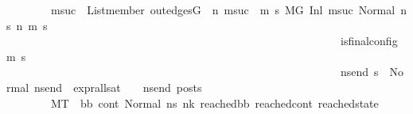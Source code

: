 \begin{isabellebody}
\ \ \ \ \ \ \ \ {\isasymforall}msuc{}{\isachardot}{\kern0pt}\ \ List{\isachardot}{\kern0pt}member\ {\isacharparenleft}{\kern0pt}out{\isacharunderscore}{\kern0pt}edges{\isacharparenleft}{\kern0pt}G{\isacharparenright}{\kern0pt}\ {\isacharbang}{\kern0pt}\ n{\isacharparenright}{\kern0pt}\ msuc{}\ {\isasymlongrightarrow}\ {\isacharparenleft}{\kern0pt}{\isasymforall}m{\isacharprime}{\kern0pt}\ s{\isacharprime}{\kern0pt}{\isachardot}{\kern0pt}\ {\isacharparenleft}{\kern0pt}{\isacharparenleft}{\kern0pt}M{\isacharcomma}{\kern0pt}{\isasymLambda}{\isacharcomma}{\kern0pt}{\isasymGamma}{\isacharcomma}{\kern0pt}{\isasymOmega}{\isacharcomma}{\kern0pt}G\ {\isasymturnstile}{\isacharparenleft}{\kern0pt}Inl\ {\isacharparenleft}{\kern0pt}msuc{}{\isacharparenright}{\kern0pt}{\isacharcomma}{\kern0pt}\ Normal\ ns{}{\isacharprime}{\kern0pt}{\isacharprime}{\kern0pt}{\isacharparenright}{\kern0pt}\ {\isacharminus}{\kern0pt}n{\isasymrightarrow}{\isacharasterisk}{\kern0pt}\ {\isacharparenleft}{\kern0pt}m{\isacharprime}{\kern0pt}{\isacharcomma}{\kern0pt}\ s{\isacharprime}{\kern0pt}{\isacharparenright}{\kern0pt}{\isacharparenright}{\kern0pt}\ {\isasymlongrightarrow}\isanewline
\ \ \ \ \ \ \ \ \ \ \ \ \ \ \ \ \ \ \ \ \ \ \ \ \ \ \ \ \ \ \ \ \ \ \ \ \ \ \ \ \ \ \ \ \ \ \ \ \ \ \ \ \ \ \ \ \ \ \ \ is{\isacharunderscore}{\kern0pt}final{\isacharunderscore}{\kern0pt}config\ {\isacharparenleft}{\kern0pt}m{\isacharprime}{\kern0pt}{\isacharcomma}{\kern0pt}\ s{\isacharprime}{\kern0pt}{\isacharparenright}{\kern0pt}\ {\isasymlongrightarrow}\ \isanewline
\ \ \ \ \ \ \ \ \ \ \ \ \ \ \ \ \ \ \ \ \ \ \ \ \ \ \ \ \ \ \ \ \ \ \ \ \ \ \ \ \ \ \ \ \ \ \ \ \ \ \ \ \ \ \ \ \ \ \ \ {\isacharparenleft}{\kern0pt}{\isasymforall}ns{\isacharunderscore}{\kern0pt}end{\isachardot}{\kern0pt}\ s{\isacharprime}{\kern0pt}\ {\isacharequal}{\kern0pt}\ Normal\ ns{\isacharunderscore}{\kern0pt}end\ {\isasymlongrightarrow}\ expr{\isacharunderscore}{\kern0pt}all{\isacharunderscore}{\kern0pt}sat\ {\isasymLambda}\ {\isasymGamma}\ {\isasymOmega}\ ns{\isacharunderscore}{\kern0pt}end\ posts{\isacharparenright}{\kern0pt}{\isacharparenright}{\kern0pt}{\isacharparenright}{\kern0pt}\ {\isasymLongrightarrow}\isanewline
\ \ \ \ \ \ \ \ M{\isacharcomma}{\kern0pt}{\isasymLambda}{\isacharcomma}{\kern0pt}{\isasymGamma}{\isacharcomma}{\kern0pt}{\isasymOmega}{\isacharcomma}{\kern0pt}T\ {\isasymturnstile}\ {\isacharparenleft}{\kern0pt}bb{}{\isacharcomma}{\kern0pt}\ cont{}{\isacharcomma}{\kern0pt}\ {\isacharparenleft}{\kern0pt}Normal\ ns{}{\isacharprime}{\kern0pt}{\isacharprime}{\kern0pt}{\isacharparenright}{\kern0pt}{\isacharparenright}{\kern0pt}\ {\isacharminus}{\kern0pt}n{\isasymlongrightarrow}{\isacharcircum}{\kern0pt}k\ {\isacharparenleft}{\kern0pt}reached{\isacharunderscore}{\kern0pt}bb{\isacharcomma}{\kern0pt}\ reached{\isacharunderscore}{\kern0pt}cont{\isacharcomma}{\kern0pt}\ reached{\isacharunderscore}{\kern0pt}state{\isacharparenright}{\kern0pt}\ {\isasymLongrightarrow}\ \isanewline

\end{isabellebody}
